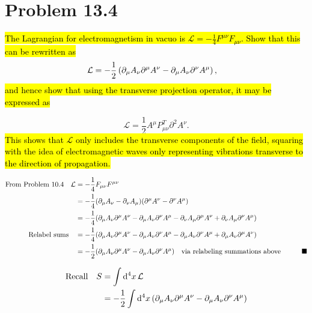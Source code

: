 \documentclass{article}
\begin{document}
\section*{Problem 13.4}
\begin{quoting}
  \hl{The Lagrangian for electromagnetism in vacuo is $\mathcal{L}=-\frac{1}{4}F^{\mu\nu}F_{\mu\nu}$. Show that this can be rewritten as}
  \[\mathcal{L}=-\frac{1}{2}\left(\partial_\mu A_\nu\partial^\mu A^\nu-\partial_\mu A_\nu\partial^\nu A^\mu\right)\qcomma\]
  \hl{and hence show that using the transverse projection operator, it may be expressed as}

  \[\mathcal{L}=\frac{1}{2}A^\mu P^T_{\mu\nu}\partial^2A^\nu.\]
  \hl{This shows that $\mathcal{L}$ only includes the transverse components of the field, squaring with the idea of electromagnetic waves only representing vibrations transverse to the direction of propagation.}
\end{quoting}


\begin{align*}
  \qq*{From Problem 10.4}\mathcal{L} & =-\frac{1}{4}F_{\mu\nu}F^{\mu\nu}                                                                                                                                              \\
                                     & =-\frac{1}{4}\pqty{\partial_\mu A_\nu - \partial_\nu A_\mu}\pqty{\partial^\mu A^\nu-\partial^\nu A^\mu}                                                                        \\
                                     & =-\frac{1}{4}\pqty{\partial_\mu A_\nu \partial^\mu A^\nu -\partial_\mu A_\nu \partial^\nu A^\mu - \partial_\nu A_\mu \partial^\mu A^\nu+\partial_\nu A_\mu \partial^\nu A^\mu} \\
  \qq*{Relabel sums}                 & =-\frac{1}{4}\pqty{\partial_\mu A_\nu \partial^\mu A^\nu -\partial_\mu A_\nu \partial^\nu A^\mu - \partial_\mu A_\nu \partial^\nu A^\mu+\partial_\mu A_\nu \partial^\mu A^\nu} \\
                                     & =-\frac{1}{2}\pqty{\partial_\mu A_\nu \partial^\mu A^\nu -\partial_\mu A_\nu \partial^\nu A^\mu} \qq{via relabeling summations above}\qquad\blacksquare                        \\
\end{align*}

\begin{align*}
  \qq*{Recall} S & =\int\dd[4]{x}\mathcal {L}                                                                                    \\
                 & =-\frac{1}{2}\int\dd[4]{x}\pqty{\partial_\mu A_\nu \partial^\mu A^\nu -\partial_\mu A_\nu \partial^\nu A^\mu} \\
\end{align*}
\end{document}
